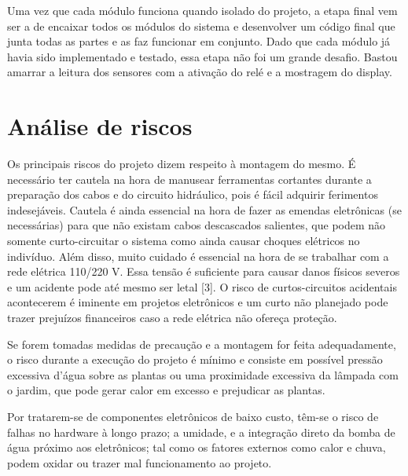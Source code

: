 \documentclass[a4paper,12pt]{article}
\begin{document}
    Uma vez que cada módulo funciona quando isolado do projeto, a etapa final vem ser a de encaixar todos os módulos do sistema e desenvolver um código final que junta todas as partes e as faz funcionar em conjunto. Dado que cada módulo já havia sido implementado e testado, essa etapa não foi um grande desafio. Bastou amarrar a leitura dos sensores com a ativação do relé e a mostragem do display.


\newpage
\section{Análise de riscos}
Os principais riscos do projeto dizem respeito à montagem do mesmo. É necessário ter cautela na hora de manusear ferramentas cortantes durante a preparação dos cabos e do circuito hidráulico, pois é fácil adquirir ferimentos indesejáveis. Cautela é ainda essencial na hora de fazer as emendas eletrônicas (se necessárias) para que não existam cabos descascados salientes, que podem não somente curto-circuitar o sistema como ainda causar choques elétricos no indivíduo. Além disso, muito cuidado é essencial na hora de se trabalhar com a rede elétrica 110/220 V. Essa tensão é suficiente para causar danos físicos severos e um acidente pode até mesmo ser letal [3]. O risco de curtos-circuitos acidentais acontecerem é iminente em projetos eletrônicos e um curto não planejado pode trazer prejuízos financeiros caso a rede elétrica não ofereça proteção.

    Se forem tomadas medidas de precaução e a montagem for feita adequadamente, o risco durante a execução do projeto é mínimo e consiste em possível pressão excessiva d’água sobre as plantas ou uma proximidade excessiva da lâmpada com o jardim, que pode gerar calor em excesso e prejudicar as plantas.
    
    Por tratarem-se de componentes eletrônicos de baixo custo, têm-se o risco de falhas no hardware à longo prazo; a umidade, e a integração direto da bomba de água próximo aos eletrônicos; tal como os fatores externos como calor e chuva, podem oxidar ou trazer mal funcionamento ao projeto.  


\newpage
\end{document}
